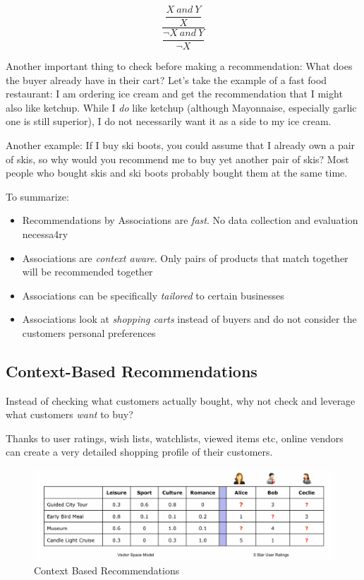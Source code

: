 \documentclass[11pt]{article}
\begin{document}
\begin{equation}
    \dfrac{\dfrac{X\ and\ Y}{X}}{\dfrac{¬X\ and\ Y}{¬X}}
\end{equation}

\vspace{10px}

Another important thing to check before making a recommendation: What does the buyer already have in their cart? Let's take the example of a fast food restaurant: I am ordering ice cream and get the recommendation that I might also like ketchup. While I \textit{do} like ketchup (although Mayonnaise, especially garlic one is still superior), I do not necessarily want it as a side to my ice cream.

Another example: If I buy ski boots, you could assume that I already own a pair of skis, so why would you recommend me to buy yet another pair of skis? Most people who bought skis and ski boots probably bought them at the same time.

\vspace{10px}

To summarize:

\begin{itemize}
    \item Recommendations by Associations are \textit{fast}. No data collection and evaluation necessa4ry
    \item Associations are \textit{context aware}. Only pairs of products that match together will be recommended together
    \item Associations can be specifically \textit{tailored} to certain businesses
    \item Associations look at \textit{shopping carts} instead of buyers and do not consider the customers personal preferences
\end{itemize}

\subsection{Context-Based Recommendations}

Instead of checking what customers actually bought, why not check and leverage what customers \textit{want} to buy?

Thanks to user ratings, wish lists, watchlists, viewed items etc, online vendors can create a very detailed shopping profile of their customers.

\begin{figure}[htb!]
    \centering
    \includegraphics[keepaspectratio=true, width=\linewidth]{context_based_recommendations.png}
    \caption{Context Based Recommendations}
    \label{fig:context_based_recommendations}
\end{figure}
\end{document}
